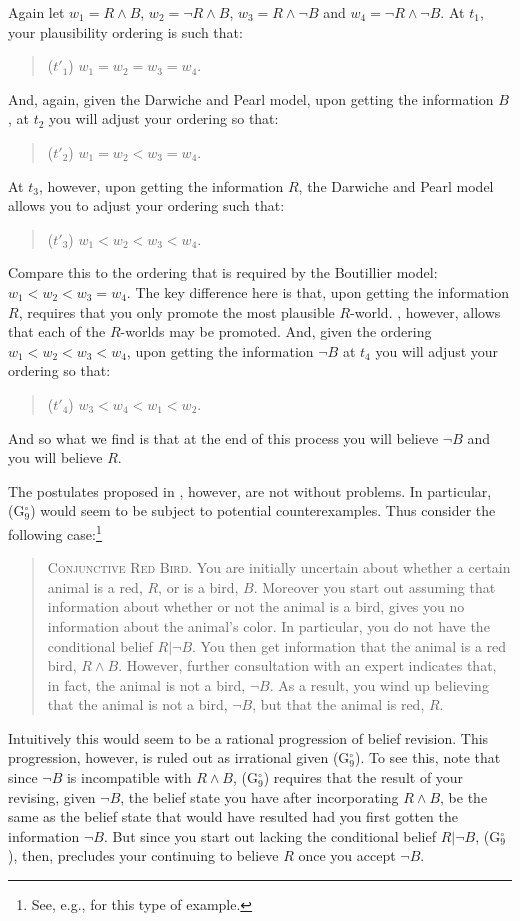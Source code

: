 Again let $w_1 = R \wedge B$, $w_2 = \lnot R \wedge B$, $w_3 = R \wedge \lnot B$ and $w_4 =  \lnot R \wedge \lnot B$.
At $t_1$, your plausibility ordering is such that:
\begin{quote}
($t'_1$) \quad $w_1 = w_2 = w_3 = w_4$.
\end{quote} 
And, again, given the Darwiche and Pearl model, upon getting the information $B$, at $t_2$ you will adjust your ordering so that: 
\begin{quote}
($t'_2$) \quad $w_1 = w_2 < w_3 = w_4$.
\end{quote}
At $t_3$, however, upon getting the information $R$, the Darwiche and Pearl model allows you to adjust your ordering such that:
\begin{quote}
($t'_3$) \quad $w_1 < w_2 < w_3 < w_4$.
\end{quote} 
Compare this to the ordering that is required by the Boutillier model: $w_1 < w_2 < w_3 = w_4$.
The key difference here is that, upon getting the information $R$, \citet{Boutilier1} requires that you only promote the most plausible $R$-world.
\citet{DarwichePearle}, however, allows that each of the $R$-worlds may be promoted.
And, given the ordering $w_1 < w_2 < w_3 < w_4$, upon getting the information $\lnot B$ at $t_4$ you will adjust your ordering so that: 
\begin{quote}
($t'_4$) \quad $w_3 < w_4 < w_1 < w_2$. 
\end{quote} 
And so what we find is that at the end of this process you will believe $\lnot B$ and you will believe $R$.

The postulates proposed in \citet{DarwichePearle}, however, are not without problems.
In particular, (G$^\circ_9$) would seem to be subject to potential counterexamples.
Thus consider the following case:\footnote{See, e.g., \citet{Stalnaker1} for this type of example.}
\begin{quote}
\textsc{Conjunctive Red Bird.} You are initially uncertain about whether a certain animal is a red, $R$, or is a bird, $B$.
Moreover you start out assuming that information about whether or not the animal is a bird, gives you no information about the animal's color.
In particular, you do not have the conditional belief $R | \lnot B$.
You then get information that the animal is a red bird, $R \wedge B$.
However, further consultation with an expert indicates that, in fact, the animal is not a bird, $\lnot B$.
As a result, you wind up believing that the animal is not a bird, $\lnot B$, but that the animal is red, $R$.
\end{quote}
Intuitively this would seem to be a rational progression of belief revision.
This progression, however, is ruled out as irrational given (G$^\circ_9$).
To see this, note that since $\lnot B$ is incompatible with $R \wedge B$, (G$^\circ_9$) requires that the result of your revising, given $\lnot B$, the belief state you have after incorporating $R \wedge B$, be the same as the belief state that would have resulted had you first gotten the information $\lnot B$.
But since you start out lacking the conditional belief $R | \lnot B$, (G$^\circ_9$), then, precludes your continuing to believe $R$ once you accept $\lnot B$.

